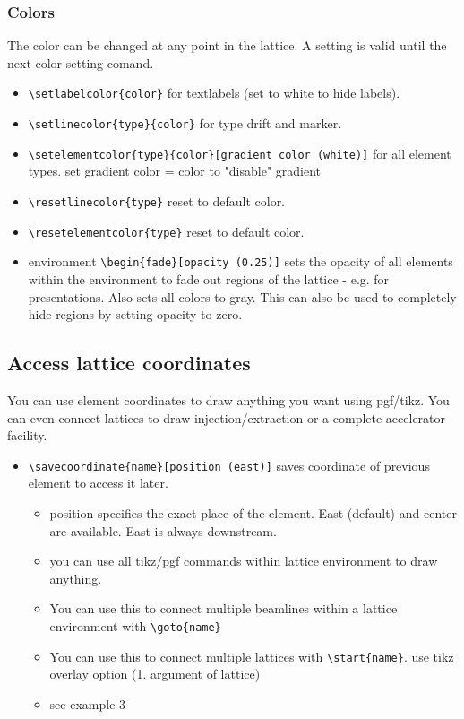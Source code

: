 \documentclass[colorlinks]{scrartcl}
\begin{document}
\subsubsection{Colors}
\label{sec-5-2-2}
The color can be changed at any point in the lattice. A setting is valid until the next color setting comand.
\begin{itemize}
\item \verb+\setlabelcolor{color}+ for textlabels (set to white to hide labels).
\item \verb+\setlinecolor{type}{color}+ for type drift and marker.
\item \verb+\setelementcolor{type}{color}[gradient color (white)]+ for all element types. set gradient color = color to "disable" gradient
\item \verb+\resetlinecolor{type}+ reset to default color.
\item \verb+\resetelementcolor{type}+ reset to default color.
\item environment \verb+\begin{fade}[opacity (0.25)]+ sets the opacity of all elements within the environment to fade out regions of the lattice - e.g. for presentations. Also sets all colors to gray.
This can also be used to completely hide regions by setting opacity to zero.
\end{itemize}
\subsection{Access lattice coordinates}
\label{sec-5-3}
You can use element coordinates to draw anything you want using pgf/tikz. You can even connect lattices to draw injection/extraction or a complete accelerator facility.
\begin{itemize}
\item \verb+\savecoordinate{name}[position (east)]+ saves coordinate of previous element
to access it later.
\begin{itemize}
\item position specifies the exact place of the element. East (default) and center are available. East is always downstream.
\item you can use all tikz/pgf commands within lattice environment to draw anything.
\item You can use this to connect multiple beamlines within a lattice environment with \verb+\goto{name}+
\item You can use this to connect multiple lattices with \verb+\start{name}+. use tikz overlay option (1. argument of lattice)
\item see example 3
\end{itemize}
\end{itemize}
\end{document}
